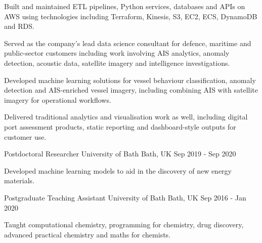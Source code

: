 \begin{cventries}
{\begin{cvitems}
        \item {Built and maintained ETL pipelines, Python services, databases and APIs on AWS using technologies including Terraform, Kinesis, S3, EC2, ECS, DynamoDB and RDS.}
        \item {Served as the company's lead data science consultant for defence, maritime and public-sector customers including work involving AIS analytics, anomaly detection, acoustic data, satellite imagery and intelligence investigations.}
        \item {Developed machine learning solutions for vessel behaviour classification, anomaly detection and AIS-enriched vessel imagery, including combining AIS with satellite imagery for operational workflows.}
        \item {Delivered traditional analytics and visualisation work as well, including digital port assessment products, static reporting and dashboard-style outputs for customer use.}
      \end{cvitems}
    }
  \cventry
    {Postdoctoral Researcher}
    {University of Bath}
    {Bath, UK}
    {Sep 2019 - Sep 2020}
    {
      \begin{cvitems}
        \item {Developed machine learning models to aid in the discovery of new energy materials.}
      \end{cvitems}
    }
  \cventry
    {Postgraduate Teaching Assistant}
    {University of Bath}
    {Bath, UK}
    {Sep 2016 - Jan 2020}
    {
      \begin{cvitems}
        \item {Taught computational chemistry, programming for chemistry, drug discovery, advanced practical chemistry and maths for chemists.}
      \end{cvitems}
    }
\end{cventries}
